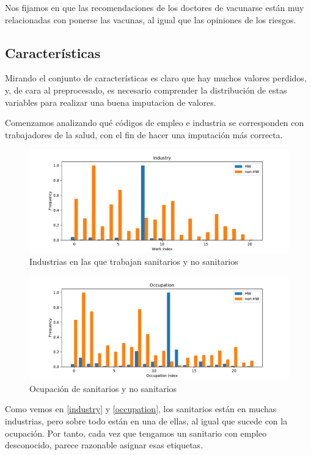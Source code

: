\documentclass[twoside,openright,titlepage,numbers=noenddot,openany,headinclude,footinclude=true,
cleardoublepage=empty,abstractoff,BCOR=5mm,paper=a4,fontsize=12pt,main=spanish]{scrreprt}
\begin{document}
Nos fijamos en que las recomendaciones de los doctores de vacunarse están muy relacionadas con ponerse las vacunas, al igual que las opiniones de los riesgos.

\subsection{Características}

Mirando el conjunto de características es claro que hay muchos valores perdidos, y, de cara al preprocesado, es necesario comprender la distribución de estas variables para realizar una buena imputacion de valores.

Comenzamos analizando qué códigos de empleo e industria se corresponden con trabajadores de la salud, con el fin de hacer una imputación más correcta.

\begin{figure}[H]
\includegraphics[scale=0.5]{industry.pdf}
\caption{Industrias en las que trabajan sanitarios y no sanitarios}
\label{industry}
\end{figure}

\begin{figure}[H]
\includegraphics[scale=0.5]{occupation.pdf}
\caption{Ocupación de sanitarios y no sanitarios}
\label{occupation}
\end{figure}

Como vemos en \eqref{industry} y \eqref{occupation}, los sanitarios están en muchas industrias, pero sobre todo están en una de ellas, al igual que sucede con la ocupación. Por tanto, cada vez que tengamos un sanitario con empleo desconocido, parece razonable asignar esas etiquetas.
\end{document}

